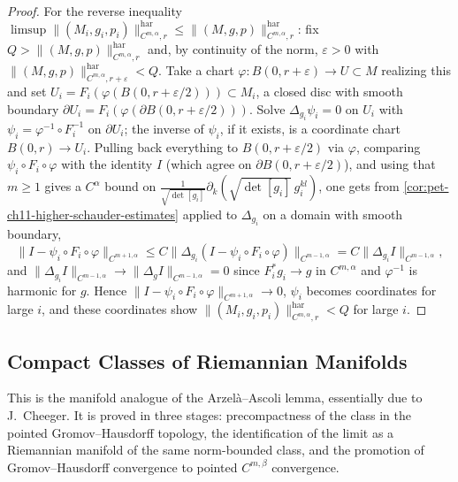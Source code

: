 \begin{proof}
  For the reverse inequality
  $\limsup\|(M_i,g_i,p_i)\|^{\mathrm{har}}_{C^{m,\alpha},r}\le\|(M,g,p)\|^{\mathrm{har}}_{C^{m,\alpha},r}$:
  fix $Q>\|(M,g,p)\|^{\mathrm{har}}_{C^{m,\alpha},r}$ and, by continuity of
  the norm, $\varepsilon>0$ with $\|(M,g,p)\|^{\mathrm{har}}_{C^{m,\alpha},r+\varepsilon}<Q$.
  Take a chart $\varphi:B(0,r+\varepsilon)\to U\subset M$ realizing this and set
  $U_i=F_i(\varphi(B(0,r+\varepsilon/2)))\subset M_i$, a closed disc with
  smooth boundary $\partial U_i=F_i(\varphi(\partial B(0,r+\varepsilon/2)))$.
  Solve $\Delta_{g_i}\psi_i=0$ on $U_i$ with
  $\psi_i=\varphi^{-1}\circ F_i^{-1}$ on $\partial U_i$; the inverse of
  $\psi_i$, if it exists, is a coordinate chart $B(0,r)\to U_i$. Pulling
  back everything to $B(0,r+\varepsilon/2)$ via $\varphi$, comparing
  $\psi_i\circ F_i\circ\varphi$ with the identity $I$ (which agree on
  $\partial B(0,r+\varepsilon/2)$), and using that $m\ge1$ gives a $C^\alpha$
  bound on
  $\frac1{\sqrt{\det[g_i]}}\partial_k(\sqrt{\det[g_i]}\,g_i^{kl})$, one gets
  from \cref{cor:pet-ch11-higher-schauder-estimates} applied to $\Delta_{g_i}$
  on a domain with smooth boundary,
  \[
    \|I-\psi_i\circ F_i\circ\varphi\|_{C^{m+1,\alpha}}
    \le C\|\Delta_{g_i}(I-\psi_i\circ F_i\circ\varphi)\|_{C^{m-1,\alpha}}
    =C\|\Delta_{g_i}I\|_{C^{m-1,\alpha}},
  \]
  and $\|\Delta_{g_i}I\|_{C^{m-1,\alpha}}\to\|\Delta_gI\|_{C^{m-1,\alpha}}=0$
  since $F_i^*g_i\to g$ in $C^{m,\alpha}$ and $\varphi^{-1}$ is harmonic for
  $g$. Hence $\|I-\psi_i\circ F_i\circ\varphi\|_{C^{m+1,\alpha}}\to0$,
  $\psi_i$ becomes coordinates for large $i$, and these coordinates show
  $\|(M_i,g_i,p_i)\|^{\mathrm{har}}_{C^{m,\alpha},r}<Q$ for large $i$.
\end{proof}

\subsection{Compact Classes of Riemannian Manifolds}

This is the manifold analogue of the Arzelà--Ascoli lemma, essentially due to
J.\ Cheeger. It is proved in three stages: precompactness of the class in the
pointed Gromov--Hausdorff topology, the identification of the limit as a
Riemannian manifold of the same norm-bounded class, and the promotion of
Gromov--Hausdorff convergence to pointed $C^{m,\beta}$ convergence.

